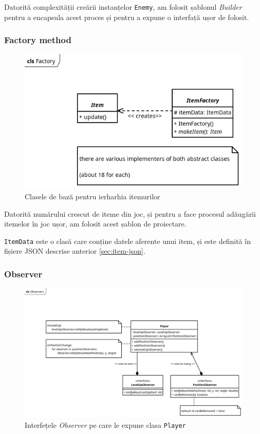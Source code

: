 \documentclass{article}
\begin{document}
    Datorită complexității creării instanțelor \texttt{Enemy}, am folosit șablonul \emph{Builder}
    pentru a encapsula acest proces și pentru a expune o interfață ușor de folosit.

    \subsubsection{Factory method}
    \begin{figure}[H]
        \includegraphics[width=\textwidth]{factory-diagram}
        \centering
        \caption{Clasele de bază pentru ierharhia itemurilor}
    \end{figure}

    Datorită numărului crescut de iteme din joc, și pentru a face procesul adăugării itemelor în joc
    ușor, am folosit acest șablon de proiectare.

    \texttt{ItemData} este o clasă care conține datele aferente unui item, și este definită în
    fișiere JSON descrise anterior \ref{sec:item-json}.

    \subsubsection{Observer}
    \begin{figure}[H]
        \includegraphics[width=\textwidth]{observers-diagram}
        \centering
        \caption{Interfețele \emph{Observer} pe care le expune clasa \texttt{Player}}
    \end{figure}
\end{document}
